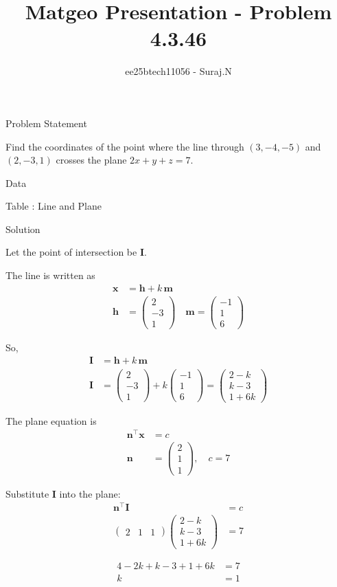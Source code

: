 \documentclass{beamer}
\title{Matgeo Presentation - Problem 4.3.46}
\author{ee25btech11056 - Suraj.N}
\numberwithin{equation}{section}
\theoremstyle{remark}
\newcommand{\myvec}[1]{\ensuremath{\begin{pmatrix}#1\end{pmatrix}}}
\let\vec\mathbf
\begin{document}
\begin{frame}
  \titlepage
\end{frame}

\begin{frame}{Problem Statement}

Find the coordinates of the point where the line through $(3,-4,-5)$ and $(2,-3,1)$ crosses the plane $2x+y+z=7$.

\end{frame}

\begin{frame}{Data}

\begin{table}[h!]
  \centering
  
  \caption*{Table : Line and Plane}
  \label{4.3.46}
\end{table}

\end{frame}

\begin{frame}{Solution}

Let the point of intersection be $\vec{I}$.  

The line is written as
\begin{align}
\vec{x} &= \vec{h} + k\,\vec{m} \\
\vec{h} &= \myvec{2\\-3\\1} \quad
\vec{m} = \myvec{-1\\1\\6}
\end{align}

So,
\begin{align}
  \vec{I} &= \vec{h} + k\,\vec{m}\\
\vec{I} &= \myvec{2\\-3\\1} + k\myvec{-1\\1\\6} = \myvec{2-k\\k-3\\1+6k}
\end{align}

\end{frame}

\begin{frame}

The plane equation is
\begin{align}
\vec{n}^\top \vec{x} &= c \\
\vec{n} &= \myvec{2\\1\\1}, \quad c=7
\end{align}

Substitute $\vec{I}$ into the plane:
\begin{align}
\vec{n}^\top \vec{I} &= c \\
\myvec{2 & 1 & 1}\myvec{2-k\\k-3\\1+6k} &= 7
\end{align}

\begin{align}
  4 - 2k + k -3 + 1 +6k &= 7\\
  k &= 1
\end{align}

\end{frame}
\end{document}
